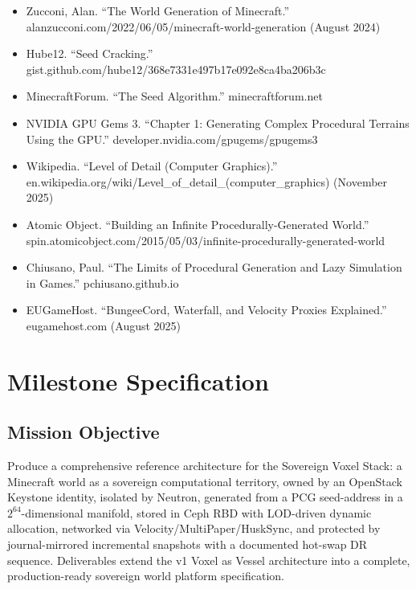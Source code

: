 \documentclass[11pt,letterpaper]{article}
\newcommand{\stageheader}[2]{%
  \noindent\colorbox{#2}{\makebox[\textwidth][l]{%
    \textcolor{white}{\bfseries\sffamily\hspace{6pt}#1\hspace{6pt}}}}%
  \vspace{0.5em}\par%
}
\begin{document}
\begin{itemize}[leftmargin=2em]
  \item Zucconi, Alan. ``The World Generation of Minecraft.'' alanzucconi.com/2022/06/05/minecraft-world-generation (August 2024)
  \item Hube12. ``Seed Cracking.'' gist.github.com/hube12/368e7331e497b17e092e8ca4ba206b3c
  \item MinecraftForum. ``The Seed Algorithm.'' minecraftforum.net
  \item NVIDIA GPU Gems 3. ``Chapter 1: Generating Complex Procedural Terrains Using the GPU.'' developer.nvidia.com/gpugems/gpugems3
  \item Wikipedia. ``Level of Detail (Computer Graphics).'' en.wikipedia.org/wiki/Level\_of\_detail\_(computer\_graphics) (November 2025)
  \item Atomic Object. ``Building an Infinite Procedurally-Generated World.'' spin.atomicobject.com/2015/05/03/infinite-procedurally-generated-world
  \item Chiusano, Paul. ``The Limits of Procedural Generation and Lazy Simulation in Games.'' pchiusano.github.io
  \item EUGameHost. ``BungeeCord, Waterfall, and Velocity Proxies Explained.'' eugamehost.com (August 2025)
\end{itemize}

\newpage

\stageheader{STAGE 3 --- MISSION PACKAGE}{tertiary}

\section{Milestone Specification}

\subsection{Mission Objective}

Produce a comprehensive reference architecture for the Sovereign Voxel Stack: a Minecraft world as a sovereign computational territory, owned by an OpenStack Keystone identity, isolated by Neutron, generated from a PCG seed-address in a $2^{64}$-dimensional manifold, stored in Ceph RBD with LOD-driven dynamic allocation, networked via Velocity/MultiPaper/HuskSync, and protected by journal-mirrored incremental snapshots with a documented hot-swap DR sequence. Deliverables extend the v1 Voxel as Vessel architecture into a complete, production-ready sovereign world platform specification.
\end{document}
